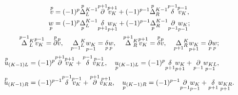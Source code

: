 \begin{gather} 


\begin{split}


\up{p}{v}&=(-1)^p\up{p}{\Delta}{}^{K-1}_L\up{p+1}{\partial} 


\up{p+1}{v_K}+(-1)^{p-1}\up{p}{\Delta}{}^{K-1}_R 


\up{p-1}{\delta}\up{p-1}{v_K},\\


%


\down{p}{w}&=(-1)^p\down{p}{\Delta}{}^{K-1}_L 


\down{p+1}{\delta}\down{p+1}{w_K}+(-1)^{p-1} 


\down{p}{\Delta}{}^{K-1}_R\down{p-1}{\partial} 


\down{p-1}{w_K};


\end{split}


\\


\up{p-1}{\Delta}{}^K_L\up{p-1}{v_K}=\up{p}{\partial} 


\up{p}{v},\quad \down{p-1}{\Delta}{}^K_L\down{p-1}{w_K}= 


\down{p}{\delta}\down{p}{w}, \quad


\up{p+1}{\Delta}{}^K_R\up{p+1}{v_K}=\up{p}{\delta}\up{p}{v},\quad 


\down{p+1}{\Delta}{}^K_R\down{p+1}{w_K}= 


\down{p}{\partial}\down{p}{w}; \\ 


\begin{split} 


\up{p}{u}_{(K-1)L}&=(-1)^p\up{p+1}{\partial} 


\up{p+1}{v_K}+\up{p-1}{\delta}\up{p-1}{v_{KL}},\quad 


\down{p}{u}_{(K-1)L}=(-1)^p\down{p+1}{\delta} 


\down{p+1}{w_K}+\down{p-1}{\partial}\down{p-1}{w_{KL}}, \\ 


% 


\up{p}{u}_{(K-1)R}&=(-1)^{p-1}\up{p-1}{\delta} 


\up{p-1}{v_K}+\up{p+1}{\partial}\up{p+1}{v_{KR}},\quad 


\down{p}{u}_{(K-1)R}=(-1)^{p-1}\down{p-1}{\partial} 


\down{p-1}{w_K}+\down{p+1}{\delta}\down{p+1}{w_{KR}}.


\end{split} 


\end{gather} 


